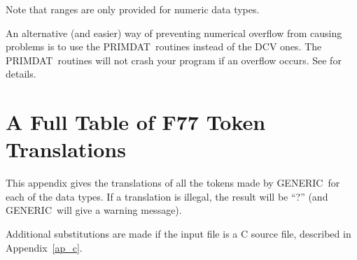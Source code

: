 \documentclass[twoside,11pt,nolof]{starlink}
\providecommand{\GENERIC}{{\footnotesize GENERIC}\normalsize}
\providecommand{\PRIMDAT}{{\footnotesize PRIMDAT}\normalsize}
\providecommand{\latexelsehtml}[2]{#1}
\begin{document}
Note that ranges are only provided for numeric data types.

An alternative (and easier) way of preventing numerical overflow from
causing problems is to use the \PRIMDAT\ routines instead of the
DCV ones.  The \PRIMDAT\ routines will not crash your program if an
overflow occurs.  See  for details.

\appendix
\newpage
\section{A Full Table of F77 Token Translations\label{ap_a}}

This appendix gives the translations of all the tokens
made by \GENERIC\ for each of the data types.
If a translation is illegal, the result will be ``?''
(and \GENERIC\ will give a warning message).

Additional substitutions are made if the input file is a C source file,
described in \latexelsehtml{Appendix~\ref{ap_c}}
{the \htmlref{C token translations}{ap_c}}.
\end{document}
